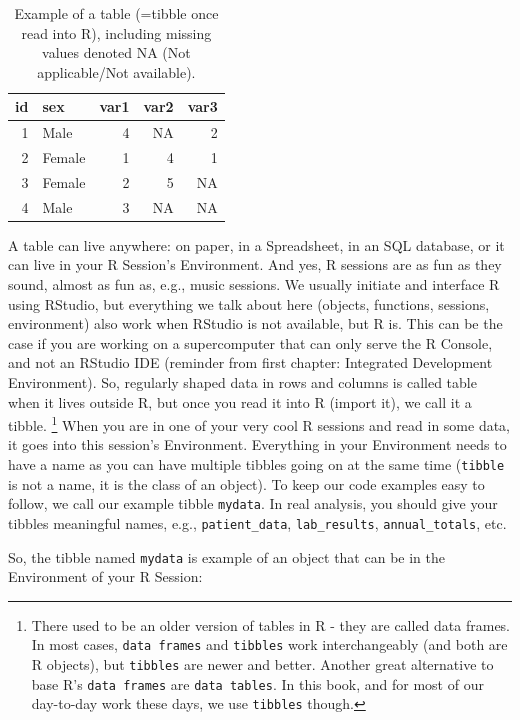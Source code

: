 \documentclass[12pt,]{krantz}
\theoremstyle{definition}
\theoremstyle{definition}
\theoremstyle{definition}
\theoremstyle{remark}
\begin{document}
\begin{table}[t]

\caption{\label{tab:chap2-tab-examp1}Example of a table (=tibble once read into R), including missing values denoted NA (Not applicable/Not available).}
\centering
\fontsize{8}{10}\selectfont
\begin{tabular}{rlrrr}
\toprule
id & sex & var1 & var2 & var3\\
\midrule
1 & Male & 4 & NA & 2\\
2 & Female & 1 & 4 & 1\\
3 & Female & 2 & 5 & NA\\
4 & Male & 3 & NA & NA\\
\bottomrule
\end{tabular}
\end{table}

A table can live anywhere: on paper, in a Spreadsheet, in an SQL
database, or it can live in your R Session's Environment. And yes, R
sessions are as fun as they sound, almost as fun as, e.g., music
sessions. We usually initiate and interface R using RStudio, but
everything we talk about here (objects, functions, sessions,
environment) also work when RStudio is not available, but R is. This can
be the case if you are working on a supercomputer that can only serve
the R Console, and not an RStudio IDE (reminder from first chapter:
Integrated Development Environment). So, regularly shaped data in rows
and columns is called table when it lives outside R, but once you read
it into R (import it), we call it a tibble. \footnote{There used to be
  an older version of tables in R - they are called data frames. In most
  cases, \texttt{data\ frames} and \texttt{tibbles} work interchangeably
  (and both are R objects), but \texttt{tibbles} are newer and better.
  Another great alternative to base R's \texttt{data\ frames} are
  \texttt{data\ tables}. In this book, and for most of our day-to-day
  work these days, we use \texttt{tibbles} though.} When you are in one
of your very cool R sessions and read in some data, it goes into this
session's Environment. Everything in your Environment needs to have a
name as you can have multiple tibbles going on at the same time
(\texttt{tibble} is not a name, it is the class of an object). To keep
our code examples easy to follow, we call our example tibble
\texttt{mydata}. In real analysis, you should give your tibbles
meaningful names, e.g., \texttt{patient\_data}, \texttt{lab\_results},
\texttt{annual\_totals}, etc.

So, the tibble named \texttt{mydata} is example of an object that can be
in the Environment of your R Session:
\end{document}
